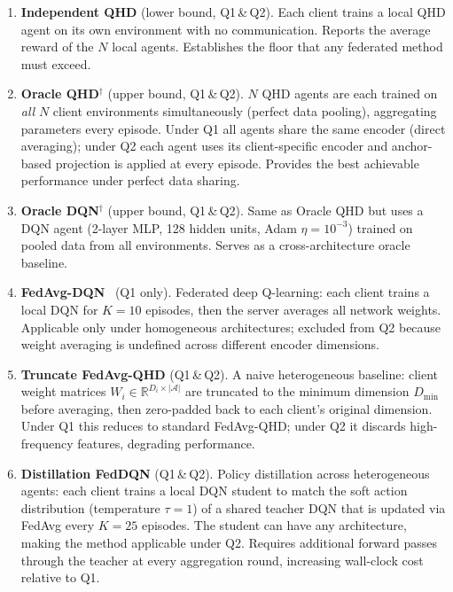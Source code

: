 \begin{enumerate}
  \item \textbf{Independent QHD} (lower bound, Q1\,\&\,Q2).
    Each client trains a local QHD agent on its own environment with no communication. Reports the average reward of the $N$ local agents. Establishes the floor that any federated method must exceed.

  \item \textbf{Oracle QHD}$^\dagger$ (upper bound, Q1\,\&\,Q2).
    $N$ QHD agents are each trained on \emph{all} $N$ client environments simultaneously (perfect data pooling), aggregating parameters every episode. Under Q1 all agents share the same encoder (direct averaging); under Q2 each agent uses its client-specific encoder and anchor-based projection is applied at every episode. Provides the best achievable performance under perfect data sharing.

  \item \textbf{Oracle DQN}$^\dagger$ (upper bound, Q1\,\&\,Q2).
    Same as Oracle QHD but uses a DQN agent (2-layer MLP, 128 hidden units, Adam $\eta=10^{-3}$) trained on pooled data from all environments. Serves as a cross-architecture oracle baseline.

  \item \textbf{FedAvg-DQN}~\cite{mcmahan2017communication} (Q1 only).
    Federated deep Q-learning: each client trains a local DQN for $K=10$ episodes, then the server averages all network weights. Applicable only under homogeneous architectures; excluded from Q2 because weight averaging is undefined across different encoder dimensions.

  \item \textbf{Truncate FedAvg-QHD} (Q1\,\&\,Q2).
    A naive heterogeneous baseline: client weight matrices $W_i \in \mathbb{R}^{D_i \times |\mathcal{A}|}$ are truncated to the minimum dimension $D_{\min}$ before averaging, then zero-padded back to each client's original dimension. Under Q1 this reduces to standard FedAvg-QHD; under Q2 it discards high-frequency features, degrading performance.

  \item \textbf{Distillation FedDQN} (Q1\,\&\,Q2).
    Policy distillation across heterogeneous agents: each client trains a local DQN student to match the soft action distribution (temperature $\tau=1$) of a shared teacher DQN that is updated via FedAvg every $K=25$ episodes. The student can have any architecture, making the method applicable under Q2. Requires additional forward passes through the teacher at every aggregation round, increasing wall-clock cost relative to Q1.
\end{enumerate}


